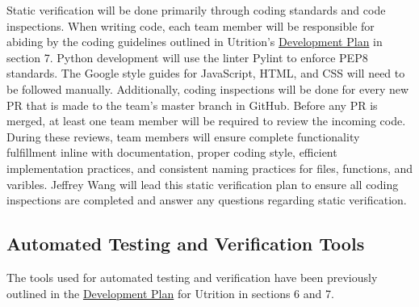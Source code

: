 \documentclass[12pt, titlepage]{article}
\begin{document}
	Static verification will be done primarily through coding standards and code inspections. When writing code, each team member will be responsible for abiding by the coding guidelines outlined in Utrition's \href{https://github.com/jeff-rey-wang/utrition/blob/dff32f8ddc662d07db9bd74e0b3705aa657dae6e/docs/DevelopmentPlan/DevelopmentPlan.pdf}{Development Plan} in section 7. Python development will use the linter Pylint to enforce PEP8 standards. The Google style guides for JavaScript, HTML, and CSS will need to be followed manually. Additionally, coding inspections will be done for every new PR that is made to the team's master branch in GitHub. Before any PR is merged, at least one team member will be required to review the incoming code. During these reviews, team members will ensure complete functionality fulfillment inline with documentation, proper coding style, efficient implementation practices, and consistent naming practices for files, functions, and varibles. Jeffrey Wang will lead this static verification plan to ensure all coding inspections are completed and answer any questions regarding static verification.
	
	\subsection{Automated Testing and Verification Tools}
	
	
	
	
	The tools used for automated testing and verification have been previously outlined in the \href{https://github.com/jeff-rey-wang/utrition/blob/dff32f8ddc662d07db9bd74e0b3705aa657dae6e/docs/DevelopmentPlan/DevelopmentPlan.pdf}{Development Plan} for Utrition in sections 6 and 7. 
	
\end{document}
